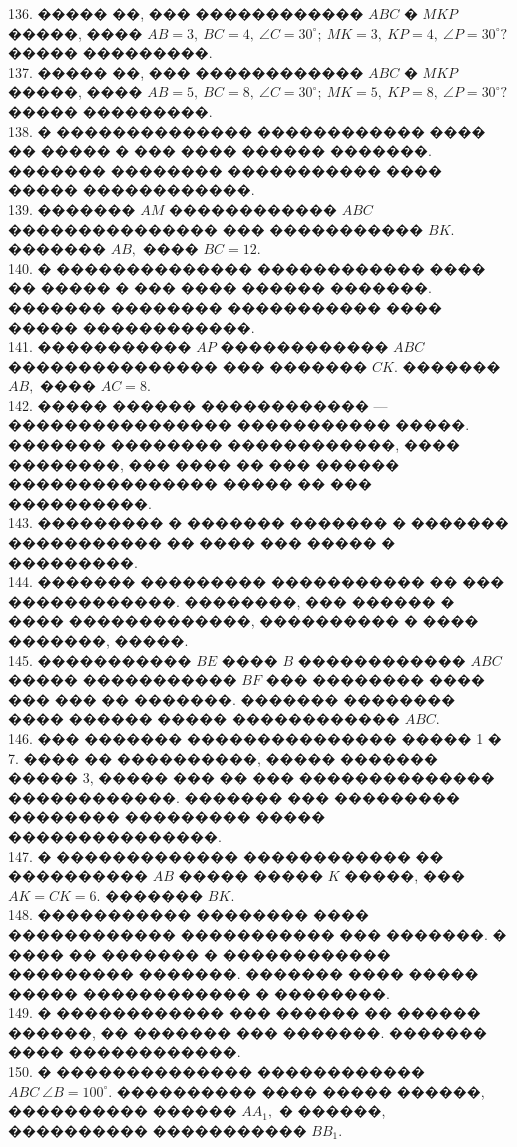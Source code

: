 \documentclass[12pt]{article}
\begin{document}
136. ����� ��, ��� ������������ $ABC$ � $MKP$ �����, ���� $AB=3,\ BC=4,\ \angle C=30^\circ;\ MK=3,\ KP=4,\ \angle P=30^\circ?$ ����� ���������.\\
137. ����� ��, ��� ������������ $ABC$ � $MKP$ �����, ���� $AB=5,\ BC=8,\ \angle C=30^\circ;\ MK=5,\ KP=8,\ \angle P=30^\circ?$ ����� ���������.\\
138. � �������������� ������������ ���� �� ����� � ��� ���� ������ �������. ������� �������� ����������� ���� ����� ������������.\\
139. ������� $AM$ ������������ $ABC$ ��������������� ��� ����������� $BK.$ ������� $AB,$ ���� $BC=12.$\\
140. � �������������� ������������ ���� �� ����� � ��� ���� ������ �������. ������� �������� ����������� ���� ����� ������������.\\
141. ����������� $AP$ ������������ $ABC$ ��������������� ��� ������� $CK.$ ������� $AB,$ ���� $AC=8.$\\
142. ����� ������ ������������ --- ���������������� ����������� �����. ������� �������� ������������, ���� ��������, ��� ���� �� ��� ������ ��������������� ����� �� ��� ����������.\\
143. ��������� � ������� ������� � ������� ����������� �� ���� ��� ����� � ���������.\\
144. ������� ��������� ����������� �� ��� ������������. ��������, ��� ������ � ���� �������������, ���������� � ���� �������, �����.\\
145. ����������� $BE$ ���� $B$ ������������ $ABC$ ����� ����������� $BF$ ��� �������� ���� ��� ��� �� �������. ������� �������� ���� ������ ����� ������������ $ABC.$\\
146. ��� ������� ��������������� ����� 1 � 7. ���� �� ����������, ����� ������� ����� 3, ����� ��� �� ��� �������������� ������������. ������� ��� ��������� �������� ��������� ����� ���������������.\\
147. � ������������� ������������ �� ���������� $AB$ ����� ����� $K$ �����, ��� $AK=CK=6.$ ������� $BK.$\\
148. ����������� �������� ���� ������������ ����������� ��� �������. � ���� �� ������� � ������������ ��������� �������. ������� ���� ����� ����� ������������ � ��������.\\
149. � ������������ ��� ������ �� ������ ������, �� ������� ��� �������. ������� ���� ������������.\\
150. � �������������� ������������ $ABC\ \angle B = 100^\circ.$ ���������� ���� ����� ������, ���������� ������ $AA_1,$ � ������, ���������� ����������� $BB_1.$\\
\end{document}
